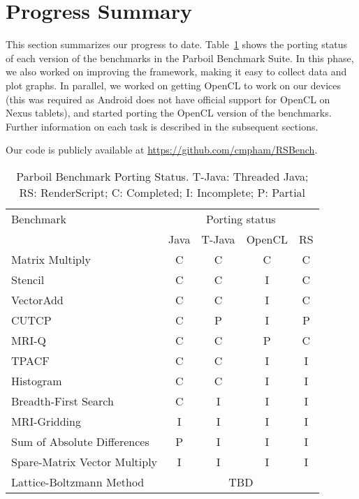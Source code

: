 \section*{Progress Summary}

This section summarizes our progress to date. Table~\ref{table:parboil} shows the
porting status of each version of the benchmarks in the Parboil Benchmark Suite.
In this phase, we also worked on improving the framework, making it easy to collect
data and plot graphs. In parallel, we worked on getting OpenCL to work on our
devices (this was required as Android does not have official support for OpenCL
on Nexus tablets), and started porting the OpenCL version of the benchmarks. 
Further information on each task is described in the subsequent sections.

Our code is publicly available at \url{https://github.com/cmpham/RSBench}.

\begin{table}[h]\small
\centering
\begin{tabular}{ | l | c | c | c | c |}
    \hline 
    Benchmark & \multicolumn{4}{|c|}{Porting status} \\ \cline{2-5}
              & Java & T-Java & OpenCL & RS \\ \hline
    Matrix Multiply & C & C & C & C \\ \hline
    Stencil & C & C & I & C \\ \hline
    VectorAdd & C & C & I & C \\ \hline
    CUTCP & C & P  & I  & P \\ \hline
    MRI-Q & C & C & P & C \\ \hline
    TPACF & C & C & I & I \\ \hline
    Histogram & C & C & I & I \\ \hline
    Breadth-First Search & C & I & I & I \\ \hline
    MRI-Gridding & I & I & I & I \\ \hline
    Sum of Absolute Differences & P & I & I & I \\ \hline
    Spare-Matrix Vector Multiply & I & I & I & I \\ \hline
    Lattice-Boltzmann Method & \multicolumn{4}{|c|}{TBD} \\ \hline
    \hline
\end{tabular}
\caption{Parboil Benchmark Porting Status. T-Java: Threaded Java; RS:
RenderScript; C: Completed; I: Incomplete; P: Partial}
\label{table:parboil}
\end{table}

